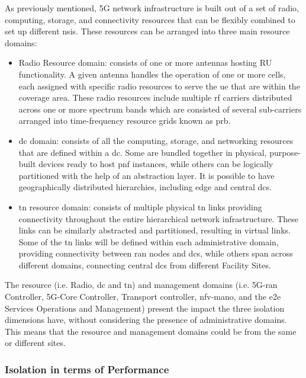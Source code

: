 As previously mentioned, 5G network infrastructure is built out of a set of radio, computing, storage, and connectivity resources that can be flexibly combined to set up different \acrshort{nsi}s. These resources can be arranged into three main resource domains:

\begin{itemize}
    \item Radio Resource domain: consists of one or more antennas hosting RU functionality. A given antenna handles the operation of one or more cells, each assigned with specific radio resources to serve the \acrshort{ue} that are within the coverage area. These radio resources include multiple \acrfull{rf} carriers distributed across one or more spectrum bands which are consisted of several sub-carriers arranged into time-frequency resource grids known as \acrfull{prb}.
    \item \acrfull{dc} domain: consists of all the computing, storage, and networking resources that are defined within a \acrshort{dc}. Some are bundled together in physical, purpose-built devices ready to host \acrshort{pnf} instances, while others can be logically partitioned with the help of an abstraction layer. It is possible to have geographically distributed hierarchies, including edge and central \acrshort{dc}s. 
    \item \acrfull{tn} resource domain: consists of multiple physical \acrshort{tn} links providing connectivity throughout the entire hierarchical network infrastructure. These links can be similarly abstracted and partitioned, resulting in virtual links. Some of the \acrshort{tn} links will be defined within each administrative domain, providing connectivity between \acrshort{ran} nodes and \acrshort{dc}s, while others span across different domains, connecting central \acrshort{dc}s from different Facility Sites.
\end{itemize}

The resource (i.e. Radio, \acrshort{dc} and \acrshort{tn}) and management domains (i.e. 5G-\acrshort{ran} Controller, 5G-Core Controller, Transport controller, \acrshort{nfv}-\acrshort{mano}, and the \acrshort{e2e} Services Operations and Management) present the impact the three isolation dimensions have, without considering the presence of administrative domains. This means that the resource and management domains could be from the same or different sites.

    \subsubsection{Isolation in terms of Performance} 
    \label{chap:isolation-performance}
    
